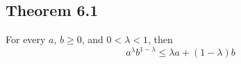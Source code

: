 \documentclass[../main.tex]{subfiles}
\begin{document}
\subsection{Theorem 6.1}
\begin{wts}
For every $a$, $b\geq0$, and $0<\lambda<1$, then
\[
a^\lambda b^{1-\lambda}\leq\lambda a+(1-\lambda)b
\]
\end{wts}
\end{document}

